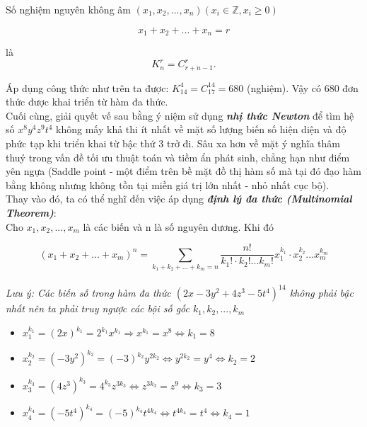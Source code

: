 \documentclass[a4paper]{exam}
\begin{document}
	Số nghiệm nguyên không âm $(x_{1}, x_{2}, ..., x_{n}) (x_{i} \in \mathbb{Z}, x_{i} \geq 0)$  
	
	$$x_{1} + x_{2} + ... + x_{n} = r$$
	
	là 
	\[
	K_n^r = C_{r+n-1}^r.
	\]
	
	Áp dụng công thức như trên ta được: $K_{14}^4 = C_{17}^{14} = 680 $ (nghiệm). Vậy có 680 đơn thức được khai triển từ hàm đa thức.\\
	
	Cuối cùng, giải quyết vế sau bằng ý niệm sử dụng \textbf{\textit{nhị thức Newton}} để tìm hệ số $x^{8}y^{4}z^{9}t^{4}$ không mấy khả thi ít nhất về mặt số lượng biến số hiện diện và độ phức tạp khi triển khai từ bậc thứ 3 trở đi. Sâu xa hơn về mặt ý nghĩa thâm thuý trong vấn đề tối ưu thuật toán và tiềm ẩn phát sinh, chẳng hạn như điểm yên ngựa (Saddle point - một điểm trên bề mặt đồ thị hàm số mà tại đó đạo hàm bằng không nhưng không tồn tại miền giá trị lớn nhất - nhỏ nhất cục bộ).\\
	
	Thay vào đó, ta có thể nghĩ đến việc áp dụng \textbf{\textit{định lý đa thức (Multinomial Theorem)}}:\\
	
	Cho $x_{1}, x_{2}, ..., x_{m}$ là các biến và n là số nguyên dương. Khi đó
	
	\[
		(x_{1} + x_{2} + ... + x_{m})^{n} = \sum_{k_{1} + k_{2} + ... + k_{m} = n} \frac{n!}{k_{1}! \cdot k_{2}! ... k_{m}!} x_{1}^{k_{1}} \cdot x_{2}^{k_{2}} ... x_{m}^{k_{m}}
	\]\\
	
	\textit{Lưu ý: Các biến số trong hàm đa thức $(2x - 3y^{2} + 4z^{3} - 5t^{4})^{14} $ không phải bậc nhất nên ta phải truy ngược các bội số gốc $k_{1}, k_{2}, ..., k_{m}$}
	
	\begin{itemize}
		\item $x_{1}^{k_{1}} = (2x)^{k_{1}} = 2^{k_{1}} x^{k_{1}} \Longrightarrow x^{k_{1}} = x^{8} \Longleftrightarrow \boxed{k_{1} = 8}$
		\item $x_{2}^{k_{2}} = (-3y^{2})^{k_{2}} = (-3)^{k_{2}} y^{2k_{2}} \Longleftrightarrow y^{2k_{2}} = y^{4} \Longleftrightarrow \boxed{k_{2} = 2}$
		\item $x_{3}^{k_{3}} = (4z^{3})^{k_{3}} = 4^{k_{3}} z^{3k_{3}} \Longleftrightarrow z^{3k_{3}} = z^{9} \Longleftrightarrow \boxed{k_{3} = 3}$
		\item $x_{4}^{k_{4}} = (-5t^{4})^{k_{4}} = (-5)^{k_{4}} t^{4k_{4}} \Longleftrightarrow t^{4k_{4}} = t^{4} \Longleftrightarrow \boxed{k_{4} = 1}$
	\end{itemize}
	
\end{document}
